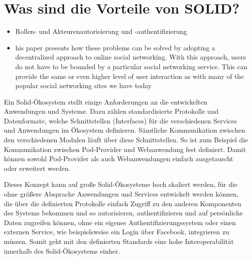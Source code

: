\documentclass[acmtog]{acmart}
\begin{document}


\label{section:wasSindDieVorteileVonSolid}
\section{Was sind die Vorteile von SOLID?}

\begin{itemize}
    \item Rollen- und Akteurenautorisierung und -authentifizierung\cite{8633673}
    \item his paper presents how these problems can be solved by adopting a decentralized approach to online social networking. With
this approach, users do not have to be bounded by a particular social networking service. This can provide the same or even
higher level of user interaction as with many of the popular social networking sites we have today\cite{yeung2023decentralization}
\end{itemize}

Ein Solid-Ökosystem stellt einige Anforderungen an die entwickelten Anwendungen und Systeme. Dazu zählen standardisierte Protokolle und Datenformate, welche Schnittstellen (Interfaces) für die verschiedenen Services und Anwendungen im Ökosystem definieren. Sämtliche Kommunikation zwischen den verschiedenen Modulen läuft über diese Schnittstellen. So ist zum Beispiel die Kommunikation zwischen Pod-Provider und Webanwendung fest definiert. Damit können sowohl Pod-Provider als auch Webanwendungen einfach ausgetauscht oder erweitert werden. 

Dieses Konzept kann auf große Solid-Ökosysteme hoch skaliert werden, für die ohne größere Absprache Anwendungen und Services entwickelt werden können, die über die definierten Protokolle einfach Zugriff zu den anderen Komponenten des Systems bekommen und so autorisieren, authentifizieren und auf persönliche Daten zugreifen können, ohne ein eigenes Authentifizierungssystem oder einen externen Service, wie beispielsweise ein Login über Facebook, integrieren zu müssen. Somit geht mit den definierten Standards eine hohe Interoperabilität innerhalb des Solid-Ökosystems einher.
\cite{8633673}
\end{document}
